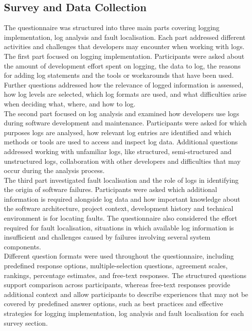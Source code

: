 \subsection{Survey and Data Collection}
The questionnaire was structured into three main parts covering logging implementation, log analysis and fault localisation.
Each part addressed different activities and challenges that developers may encounter when working with logs.
\\
The first part focused on logging implementation. Participants were asked about the amount of development effort spent on logging,
the data to log, the reasons for adding log statements and the tools or workarounds that have been used.
Further questions addressed how the relevance of logged information is assessed, how log levels are selected,
which log formats are used, and what difficulties arise when deciding what, where, and how to log.
\\
The second part focused on log analysis and examined how developers use logs during software development and maintenance.
Participants were asked for which purposes logs are analysed, how relevant log entries are identified
and which methods or tools are used to access and inspect log data.
Additional questions addressed working with unfamiliar logs, like structured, semi-structured and unstructured logs, collaboration with other developers
and difficulties that may occur during the analysis process.
\\
The third part investigated fault localisation and the role of logs in identifying the origin of software failures.
Participants were asked which additional information is required alongside log data and how important knowledge
about the software architecture, project context, development history and technical environment is for locating faults.
The questionnaire also considered the effort required for fault localisation, situations in which available log information
is insufficient and challenges caused by failures involving several system components.
\\
Different question formats were used throughout the questionnaire, including predefined response options,
multiple-selection questions, agreement scales, rankings, percentage estimates, and free-text responses.
The structured questions support comparison across participants, whereas free-text responses provide additional
context and allow participants to describe experiences that may not be covered by predefined answer options, such as
best practices and effective strategies for logging implementation, log analysis and fault localisation for each survey section.

